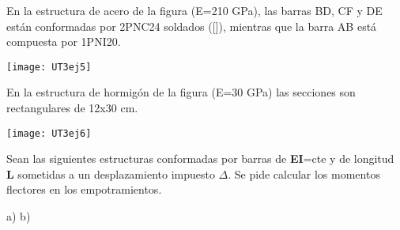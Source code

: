 \ejercicio

En la estructura de acero de la figura (E=210 GPa), las barras BD, CF y DE están conformadas por 2PNC24 soldados ([]), mientras que la barra AB está compuesta por 1PNI20. 


\begin{center}
	\texttt{[image: UT3ej5]}
\end{center}



\ejercicio 

En la estructura de hormigón de la figura (E=30 GPa) las secciones son rectangulares de 12x30 cm. 

\begin{center}
	\texttt{[image: UT3ej6]}
\end{center}


\ejercicio


Sean las siguientes estructuras conformadas por barras de \textbf{EI}=cte y de longitud \textbf{L} sometidas a un desplazamiento impuesto $\Delta$. Se pide calcular los momentos flectores en los empotramientos.


\begin{center}
	\def\svgwidth{0.45\textwidth}
	a) 
	\def\svgwidth{0.45\textwidth}
	b) 
\end{center}



\begin{center}
\end{center}


